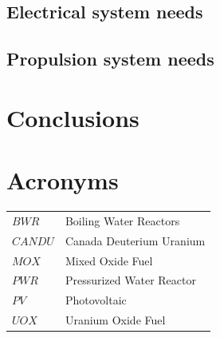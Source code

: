\documentclass{article}
\begin{document}
\subsection{Electrical system needs}

\subsection{Propulsion system needs}







\section{Conclusions}



\section*{Acronyms}

\begin{tabular}{ l  l }
    $BWR$         &Boiling Water Reactors\\
    $CANDU$       &Canada Deuterium Uranium\\
    $MOX$         &Mixed Oxide Fuel\\
    $PWR$         &Pressurized Water Reactor\\
    $PV$          &Photovoltaic\\
    $UOX$         &Uranium Oxide Fuel
 \end{tabular}


\clearpage


\end{document}

